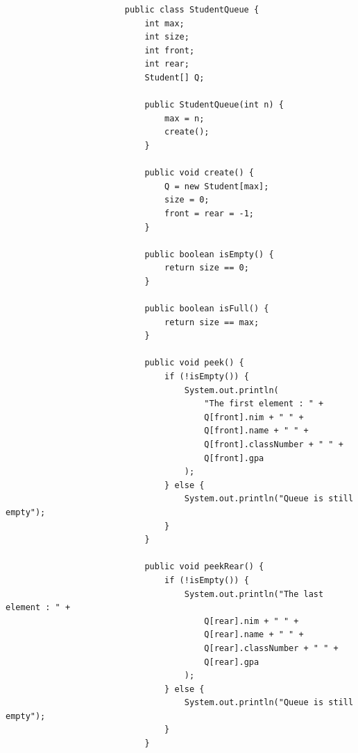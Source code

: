 \documentclass[12pt,titlepage]{article}
\begin{document}
\begin{enumerate}
{\begin{itemize}
\begin{itemize}
{                    \begin{verbatim}
                        public class StudentQueue {
                            int max;
                            int size;
                            int front;
                            int rear;
                            Student[] Q;

                            public StudentQueue(int n) {
                                max = n;
                                create();
                            }

                            public void create() {
                                Q = new Student[max];
                                size = 0;
                                front = rear = -1;
                            }

                            public boolean isEmpty() {
                                return size == 0;
                            }

                            public boolean isFull() {
                                return size == max;
                            }

                            public void peek() {
                                if (!isEmpty()) {
                                    System.out.println(
                                        "The first element : " + 
                                        Q[front].nim + " " + 
                                        Q[front].name + " " + 
                                        Q[front].classNumber + " " + 
                                        Q[front].gpa
                                    );
                                } else {
                                    System.out.println("Queue is still empty");
                                }
                            }

                            public void peekRear() {
                                if (!isEmpty()) {
                                    System.out.println("The last element : " + 
                                        Q[rear].nim + " " + 
                                        Q[rear].name + " " + 
                                        Q[rear].classNumber + " " + 
                                        Q[rear].gpa
                                    );
                                } else {
                                    System.out.println("Queue is still empty");
                                }
                            }


\end{verbatim}}
\end{itemize}
\end{itemize}}
\end{enumerate}
\end{document}
